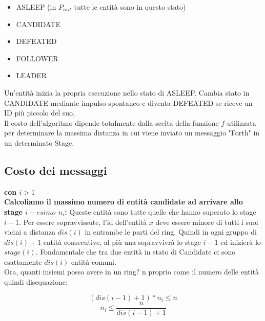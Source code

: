 \begin{itemize}
    \item ASLEEP (in $P_{init}$ tutte le entità sono in questo stato)
    \item CANDIDATE
    \item DEFEATED
    \item FOLLOWER
    \item LEADER
\end{itemize}

Un'entità inizia la propria esecuzione nello stato di ASLEEP. Cambia stato in
CANDIDATE mediante impulso spontaneo e diventa DEFEATED se riceve un ID più
piccolo del suo.\\
Il costo dell'algoritmo dipende totalmente dalla scelta della funzione $f$
utilizzata per determinare la massima distanza in cui viene inviato un messaggio
"Forth" in un determinato Stage.

\subsection{Costo dei messaggi}
\textbf{con $i>1$}\\
\textbf{Calcoliamo il massimo numero di entità candidate ad arrivare allo stage $i-esimo$ $n_i$:}
Queste entità sono tutte quelle che hanno superato lo stage $i-1$. Per essere
sopravvissute, l'id dell'entità $x$ deve essere minore di tutti i suoi vicini a
distanza $dis(i)$ in entrambe le parti del ring. Quindi in ogni gruppo di
$dis(i) + 1$ entità consecutive, al più una sopravvivrà lo stage $i-1$ ed
inizierà lo $stage(i)$. Fondamentale che tra due entità in stato di Candidate ci
sono esattamente $dis(i)$ entità comuni.\\
Ora, quanti insiemi posso avere in un ring? n proprio come il numero delle
entità quindi disequazione:

$$(dis(i-1)+1) * n_i \leq n$$
$$n_i \leq \frac{n}{dis(i-1) + 1}$$

